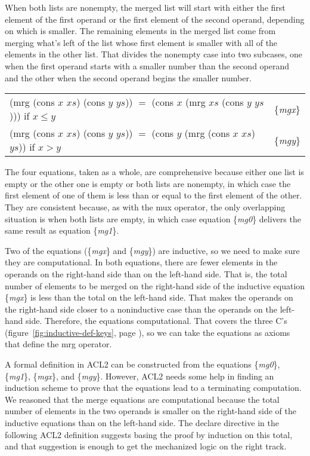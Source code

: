 When both lists are nonempty, the merged list will
start with either the first element of the first operand
or the first element of the second operand,
depending on which is smaller.
The remaining elements in the merged list come from
merging what's left of the list whose first element is smaller
with all of the elements in the other list.
That divides the nonempty case into two
subcases, one when the first operand starts with a smaller number
than the second operand
and the other when the second operand begins the smaller number.

\begin{center}
\begin{tabular}{ll}
\textsf{(mrg (cons $x$ $xs$) (cons $y$ $ys$)) $=$ (cons $x$ (mrg $xs$ (cons $y$ $ys$)))} if $x \le y$ & \{\emph{mgx}\} \\
\textsf{(mrg (cons $x$ $xs$) (cons $y$ $ys$)) $=$ (cons $y$ (mrg (cons $x$ $xs$) $ys$))} if $x > y$   & \{\emph{mgy}\} \\
\end{tabular}
\end{center}

The four equations, taken as a whole, are comprehensive
because either one list is empty or the other one is empty
or both lists are nonempty,
in which case the first element of one of them
is less than or equal to the first element of the other.
They are consistent because, as with the \textsf{mux} operator,
the only overlapping situation is when
both lists are empty, in which case equation \{\emph{mg0}\}
delivers the same result as equation \{\emph{mg1}\}.

Two of the equations (\{\emph{mgx}\} and \{\emph{mgy}\}) are inductive,
so we need to make sure they are computational.
In both equations, there are fewer elements in the operands
on the right-hand side than on the left-hand side.
That is, the total number of elements to be merged
on the right-hand side of the inductive equation \{\emph{mgx}\}
is less than the total on the left-hand side.
That makes the operands on the right-hand side closer to
a noninductive case than the operands on the left-hand side.
Therefore, the equations computational.
That covers the three C's
(figure~\ref{fig:inductive-def-keys}, page \pageref{fig:inductive-def-keys}),
so we can take the equations as axioms that define the \textsf{mrg} operator.

A formal definition in ACL2 can be constructed from
the equations \{\emph{mg0}\}, \{\emph{mg1}\}, \{\emph{mgx}\}, and \{\emph{mgy}\}.
However, ACL2 needs some help in finding an induction scheme
to prove that the equations lead to a terminating computation.
We reasoned that the merge equations are computational
because the total number of elements in the two operands
is smaller on the right-hand side of the inductive equations
than on the left-hand side.
The \textsf{declare} directive in the following ACL2 definition suggests
basing the proof by induction on this total,
and that suggestion is enough to get the mechanized logic on the right track.

